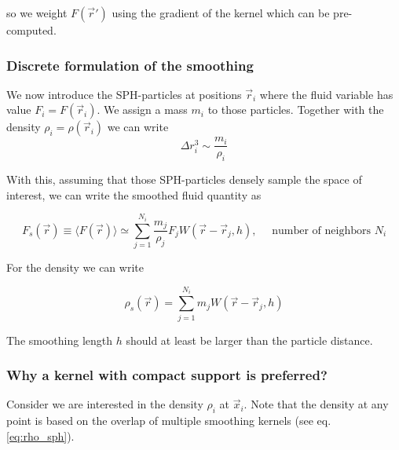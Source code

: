 so we weight $F(\vec{r}')$ using the gradient of the kernel which can be pre-computed.

\subsubsection{Discrete formulation of the smoothing}
We now introduce the SPH-particles at positions $\vec{r}_i$ where the
fluid variable has value $F_i = F(\vec{r}_i)$. We assign a mass $m_i$
to those particles. Together with the density $\rho_i = \rho(\vec{r}_i)$
we can write
\begin{equation}
    \Delta r_i^3 \sim \frac{m_i}{\rho_i}
\end{equation}

With this, assuming that those SPH-particles densely sample the space of interest,
we can write the smoothed fluid quantity as

\begin{equation}
    \label{eq:smoothed_fluid_quantity}
    \boxed{F_s(\vec{r}) \equiv\langle F(\vec{r})\rangle \simeq \sum_{j=1}^{N_i} \frac{m_j}{\rho_j} F_j W\left(\vec{r}-\vec{r}_j, h\right), \quad \text { number of neighbors } N_i}
\end{equation}



For the density we can write

\begin{equation}
    \label{eq:rho_sph}
    \boxed{\rho_s (\vec{r}) = \sum_{j=1}^{N_i} m_j W(\vec{r} - \vec{r}_j,h)}
\end{equation}

The smoothing length $h$ should at least be larger than the particle distance.

\subsubsection{Why a kernel with compact support is preferred?}

Consider we are interested in the density $\rho_i$ at $\vec{x}_i$.
Note that the density at any point is based on the overlap of multiple
smoothing kernels (see eq. \ref{eq:rho_sph}).

